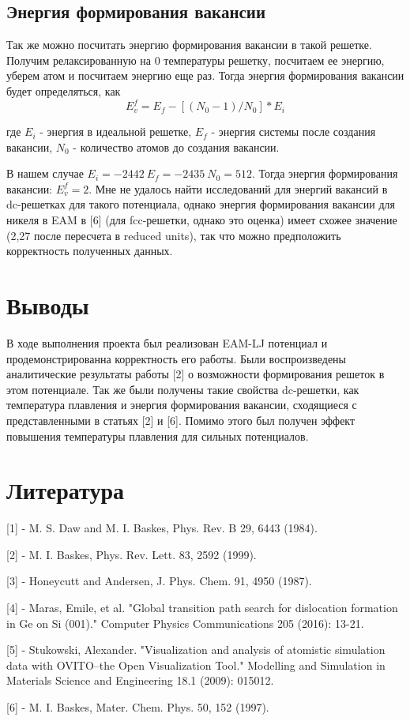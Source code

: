 \documentclass[12pt]{article}
\begin{document}
\subsection{Энергия формирования вакансии}
Так же можно посчитать энергию формирования вакансии в такой решетке. Получим релаксированную на 0 температуры решетку, посчитаем ее энергию, уберем атом и посчитаем энергию еще раз. Тогда энергия формирования вакансии будет определяться, как 
\begin{equation}
E_{v}^{f}=E_{f}-\left[\left(N_{0}-1\right) / N_{0}\right] * E_{i}
\end{equation}

где $E_i$ - энергия в идеальной решетке, $E_f$ - энергия системы после создания вакансии, $N_0$ - количество атомов до создания вакансии.

В нашем случае $E_i = -2442 \ E_f = -2435 \ N_0 = 512$. Тогда энергия формирования вакансии:
$E_v^f = 2$. Мне не удалось найти исследований для энергий вакансий в dc-решетках для такого потенциала, однако энергия формирования вакансии для никеля в EAM в [6] (для fcc-решетки, однако это оценка) имеет схожее значение (2,27 после пересчета в reduced units), так что можно предположить корректность полученных данных.

\section{Выводы}
В ходе выполнения проекта был реализован EAM-LJ потенциал и продемонстрированна корректность его работы. Были воспроизведены аналитические результаты работы [2] о возможности формирования решеток в этом потенциале. Так же были получены такие свойства dc-решетки, как температура плавления и энергия формирования вакансии, сходящиеся с представленными в статьях [2] и [6]. Помимо этого был получен эффект повышения температуры плавления для сильных потенциалов.


\newpage
\section{Литература}
\hspace{1.5em}[1] - M. S. Daw and M. I. Baskes, Phys. Rev. B 29, 6443 (1984).

[2] - M. I. Baskes, Phys. Rev. Lett. 83, 2592 (1999).

[3] - Honeycutt and Andersen, J. Phys. Chem. 91, 4950 (1987).

[4] - Maras, Emile, et al. "Global transition path search for dislocation formation in Ge on Si (001)." Computer Physics Communications 205 (2016): 13-21.

[5] - Stukowski, Alexander. "Visualization and analysis of atomistic simulation data with OVITO–the Open Visualization Tool." Modelling and Simulation in Materials Science and Engineering 18.1 (2009): 015012.

[6] - M. I. Baskes, Mater. Chem. Phys. 50, 152 (1997).
\end{document}
